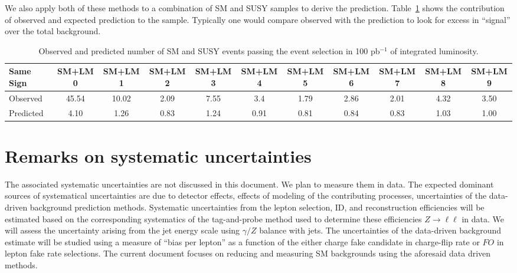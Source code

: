 We also apply both of these methods to a combination of SM and SUSY samples to derive the
prediction. Table~\ref{tab:yieldsSUSY} shows the contribution of observed and expected prediction to 
the sample. Typically one would compare observed with the prediction to look for excess 
in ``signal'' over the total background.
\vspace{0.9mm}
\begin{table}[hbt]
\begin{center}
\small\addtolength{\tabcolsep}{-5pt}
\begin{tabular}{|l|c|c|c|c|c|c|c|c|c|c|}\hline
Same Sign  & SM+LM0 & SM+LM1 & SM+LM2 & SM+LM3 & SM+LM4 & SM+LM5 & SM+LM6 & SM+LM7 & SM+LM8 & SM+LM9 \\ \hline
Observed & 45.54 & 10.02 & 2.09 & 7.55 & 3.4 &	1.79 &	2.86 &	2.01 &	4.32 &	3.50 \\ \hline
Predicted & 4.10 & 1.26 & 0.83 & 1.24 &	0.91 &	0.81 &	0.84 &	0.83 &	1.03 &	1.00 \\ \hline
\end{tabular}
\caption{Observed and predicted  number of SM and SUSY events passing the event selection in 100 pb$^{-1}$ of integrated
luminosity.\label{tab:yieldsSUSY}}
\end{center}
\end{table}

\section{Remarks on systematic uncertainties}
The associated systematic uncertainties are not discussed in this document. We plan to measure
them in data. The expected dominant sources of systematical uncertainties 
are due to detector effects, effects 
of modeling of the contributing processes, uncertainties of the data-driven background 
prediction methods.  Systematic uncertainties from the lepton selection, ID, and reconstruction efficiencies will be
estimated based on the corresponding systematics of the tag-and-probe method used to determine these efficiencies 
$Z \rightarrow \ell \ell$ in data. We will assess the uncertainty arising from the jet energy scale
using $\gamma/Z$ balance with jets. The uncertainties of the data-driven background estimate will be studied using 
a measure of ``bias per lepton'' as a function of the either charge fake candidate in charge-flip rate or $FO$ in
lepton fake rate selections. The current document focuses on reducing and measuring SM backgrounds using the aforesaid
data driven methods.

\clearpage
